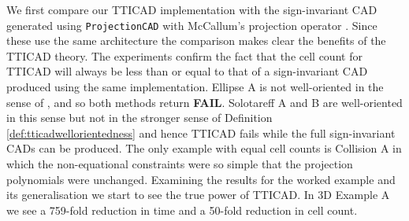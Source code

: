 \documentclass{article}
\begin{document}
We first compare our TTICAD implementation with the sign-invariant CAD generated using \texttt{ProjectionCAD} with McCallum's projection operator \cite{ProjectionCAD}.  Since these use the same architecture the comparison makes clear the benefits of the TTICAD theory.  The experiments confirm the fact that  
the cell count for TTICAD will always be less than or equal to that of a sign-invariant CAD produced using the same implementation.  Ellipse A is not well-oriented in the sense of \cite{McCallum1998}, and so both methods return {\bf FAIL}.  Solotareff A and B are well-oriented in this sense but not in the stronger sense of Definition \ref{def:tticadwellorientedness} and hence TTICAD fails while the full sign-invariant CADs can be produced.  The only example with equal cell counts is Collision A in which the non-equational constraints were so simple that the projection polynomials were unchanged.  Examining the results for the worked example and its generalisation we start to see the true power of TTICAD. In 3D Example A we see a 759-fold reduction in time and a 50-fold reduction in cell count. 
\end{document}
